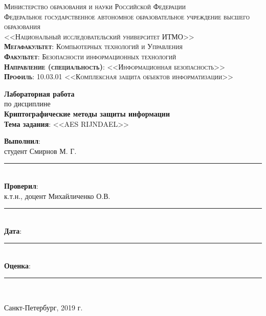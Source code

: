\begin{titlepage}
	\begin{center}
		\textsc{
			\fontsize{12pt}{14pt}\selectfont
			Министерство образования и науки Российской Федерации\\
Федеральное государственное автономное образовательное учреждение высшего образования\\
<<Национальный исследовательский университет ИТМО>>\\
	\textbf{Мегафакультет}:  Компьютерных технологий и Управления\\
			\textbf{Факультет}: Безопасности информационных технологий\\
			\textbf{Направление (специальность)}: <<Информационная безопасность>>\\
			\textbf{Профиль}: 10.03.01 <<Комплексная защита объектов информатизации>>}
		
		\vfill
		
		\textbf{Лабораторная работа}\\
		по дисциплине\\
		\textbf{Криптографические методы защиты информации}\\
	\vfill
	\textbf{Тема задания}: <<AES RIJNDAEL>>\\
	\end{center}

	\vfill
	
	\begin{flushright}
	\textbf{Выполнил}:\\ студент Смирнов М. Г. \rule{5em}{.1pt}\\
	\textbf{Проверил}:\\ к.т.н., доцент Михайличенко О.В.\rule{5em}{.1pt}\\
		\vfill
	\textbf{Дата}: \rule{10em}{.1pt}\\
	\textbf{Оценка}: \rule{10em}{.1pt}\\

	\vfill
	


	\end{flushright}
	\vfill
	\begin{center}
		Санкт-Петербург, 2019 г.
	\end{center}
\end{titlepage}
